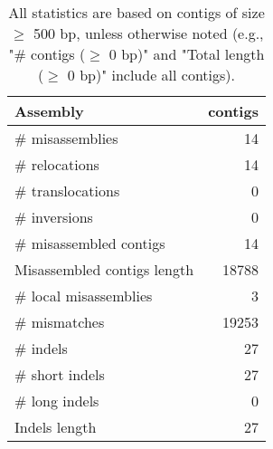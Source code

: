 \documentclass[12pt,a4paper]{article}
\begin{document}
\begin{table}[ht]
\begin{center}
\caption{All statistics are based on contigs of size $\geq$ 500 bp, unless otherwise noted (e.g., "\# contigs ($\geq$ 0 bp)" and "Total length ($\geq$ 0 bp)" include all contigs).}
\begin{tabular}{|l*{1}{|r}|}
\hline
Assembly & contigs \\ \hline
\# misassemblies & 14 \\ \hline
\hspace{5mm}\# relocations & 14 \\ \hline
\hspace{5mm}\# translocations & 0 \\ \hline
\hspace{5mm}\# inversions & 0 \\ \hline
\# misassembled contigs & 14 \\ \hline
Misassembled contigs length & 18788 \\ \hline
\# local misassemblies & 3 \\ \hline
\# mismatches & 19253 \\ \hline
\# indels & 27 \\ \hline
\hspace{5mm}\# short indels & 27 \\ \hline
\hspace{5mm}\# long indels & 0 \\ \hline
Indels length & 27 \\ \hline
\end{tabular}
\end{center}
\end{table}
\end{document}
